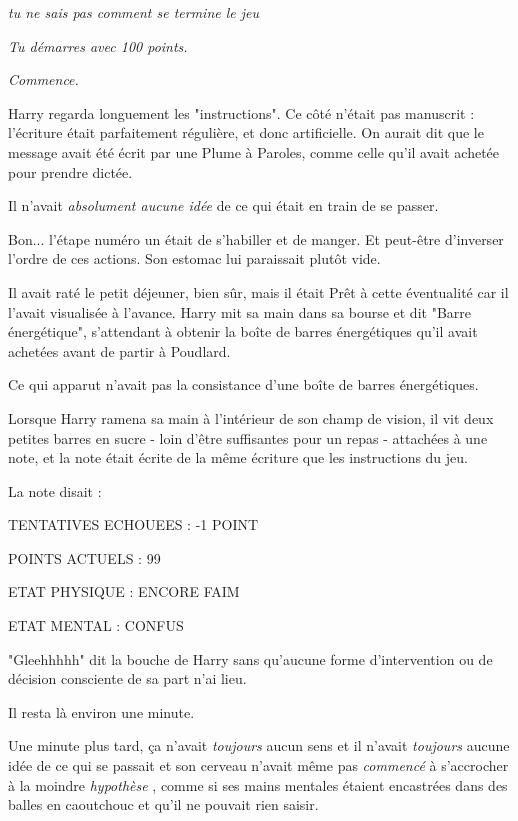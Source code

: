 \begin{center}\emph{tu ne sais pas comment se termine le jeu} \end{center}



\begin{center}\emph{Tu démarres avec 100 points.} \end{center}



\begin{center}\emph{Commence.} \end{center}


Harry regarda longuement les "instructions". Ce côté n'était pas manuscrit : l'écriture était parfaitement régulière, et donc artificielle. On aurait dit que le message avait été écrit par une Plume à Paroles, comme celle qu'il avait achetée pour prendre dictée.

Il n'avait \emph{absolument aucune idée}  de ce qui était en train de se passer.

Bon... l'étape numéro un était de s'habiller et de manger. Et peut-être d'inverser l'ordre de ces actions. Son estomac lui paraissait plutôt vide.

Il avait raté le petit déjeuner, bien sûr, mais il était Prêt à cette éventualité car il l'avait visualisée à l'avance. Harry mit sa main dans sa bourse et dit "Barre énergétique", s'attendant à obtenir la boîte de barres énergétiques qu'il avait achetées avant de partir à Poudlard.

Ce qui apparut n'avait pas la consistance d'une boîte de barres énergétiques.

Lorsque Harry ramena sa main à l'intérieur de son champ de vision, il vit deux petites barres en sucre - loin d'être suffisantes pour un repas - attachées à une note, et la note était écrite de la même écriture que les instructions du jeu.

La note disait :

TENTATIVES ECHOUEES : -1 POINT

POINTS ACTUELS : 99

ETAT PHYSIQUE : ENCORE FAIM

ETAT MENTAL : CONFUS

"Gleehhhhh" dit la bouche de Harry sans qu'aucune forme d'intervention ou de décision consciente de sa part n'ai lieu.

Il resta là environ une minute.

Une minute plus tard, ça n'avait \emph{toujours}  aucun sens et il n'avait \emph{toujours}  aucune idée de ce qui se passait et son cerveau n'avait même pas \emph{commencé}  à s'accrocher à la moindre \emph{hypothèse} , comme si ses mains mentales étaient encastrées dans des balles en caoutchouc et qu'il ne pouvait rien saisir.

